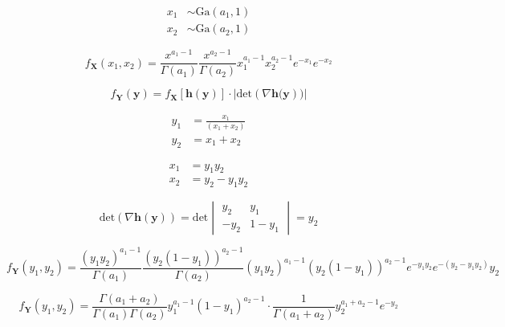 \documentclass[12pt]{article}%
\begin{document}
            \begin{align}
                  x_1 &\sim \text{Ga}(a_1, 1)\\
                  x_2 &\sim \text{Ga}(a_2, 1)
            \end{align}

            \begin{equation}\label{eq:x_joint}
                  f_{\mathbf{X}}(x_1, x_2) = \frac{x^{a_1-1}}{\Gamma(a_1)}\frac{x^{a_2-1}}{\Gamma(a_2)}x_1^{a_1-1} x_2^{a_2-1} e^{-x_1}e^{-x_2}
            \end{equation}

            \begin{equation}\label{eq:change_variables}
                  f_{\mathbf{Y}}(\mathbf{y}) = f_{\mathbf{X}}[\mathbf{h(y)}]\cdot|\text{det}(\nabla \mathbf{h(y}))|
            \end{equation}

            \begin{align}
                  y_1 &= \frac{x_1}{(x_1+x_2)} \\
                  y_2 &= x_1 + x_2
            \end{align}

            \begin{align}
                  x_1 &= y_1 y_2 \\
                  x_2 &= y_2 - y_1 y_2
            \end{align}

            \begin{equation}
                  \text{det}(\nabla \mathbf{h(y)}) = \text{det}
                  \begin{vmatrix}
                  y_2 & y_1 \\
                  -y_2 & 1-y_1
                  \end{vmatrix}
                  = y_2
            \end{equation}

            \begin{equation}
                  f_{\mathbf{Y}}(y_1, y_2) = \frac{(y_1 y_2)^{a_1-1}}{\Gamma(a_1)}\frac{(y_2 (1-y_1))^{a_2-1}}{\Gamma(a_2)}(y_1 y_2)^{a_1-1} (y_2 (1-y_1))^{a_2-1} e^{-y_1 y_2}e^{-(y_2 - y_1 y_2)} y_2
            \end{equation}

            \begin{equation}
                  f_{\mathbf{Y}}(y_1, y_2) = \frac{\Gamma(a_1 + a_2)}{\Gamma(a_1) \Gamma(a_2)} y_1^{a_1 -1} (1-y_1)^{a_2 - 1} \cdot \frac{1}{\Gamma(a_1 + a_2)} y_2^{a_1 + a_2 -1} e^{-y_2}
            \end{equation}
\end{document}
